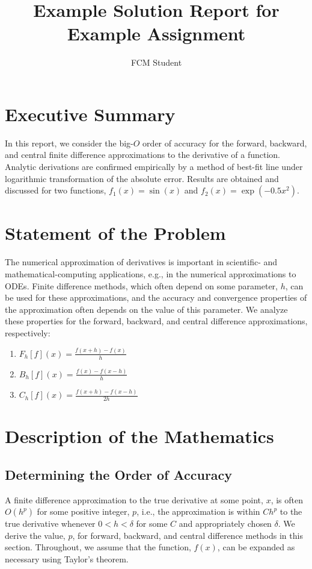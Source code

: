 \documentclass[11pt]{article}
\author{FCM Student}
\title{Example Solution Report for Example Assignment}
\begin{document}
\maketitle

\section{Executive Summary}

In this report, we consider the big-$O$ order of accuracy for the forward, backward, and central finite difference approximations to the derivative of a function. Analytic derivations are confirmed empirically by a method of best-fit line under logarithmic transformation of the absolute error. Results are obtained and discussed for two functions, $f_1(x) = \sin(x)$ and $f_2(x) = \exp(-0.5x^2)$.

\section{Statement of the Problem}

The numerical approximation of derivatives is important in scientific- and mathematical-computing applications, e.g., in the numerical approximations to ODEs. Finite difference methods, which often depend on some parameter, $h$, can be used for these approximations, and the accuracy and convergence properties of the approximation often depends on the value of this parameter. We analyze these properties for the forward, backward, and central difference approximations, respectively:

\begin{enumerate}
    \item $\displaystyle F_h[f](x) = \frac{f(x+h) - f(x)}{h}$
    \item $\displaystyle B_h[f](x) = \frac{f(x) - f(x-h)}{h}$
    \item $\displaystyle C_h[f](x) = \frac{f(x+h) - f(x-h)}{2h}$
\end{enumerate}

\section{Description of the Mathematics}

\subsection{Determining the Order of Accuracy}

A finite difference approximation to the true derivative at some point, $x$, is often $O(h^p)$ for some positive integer, $p$, i.e., the approximation is within $Ch^p$ to the true derivative whenever $0 < h < \delta$ for some $C$ and appropriately chosen $\delta$. We derive the value, $p$, for forward, backward, and central difference methods in this section. Throughout, we assume that the function, $f(x)$, can be expanded as necessary using Taylor's theorem.
\end{document}
